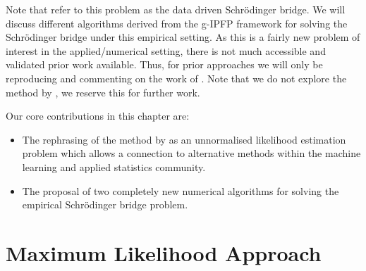 \documentclass[a4paper,12pt,twoside,openright]{report}
\theoremstyle{definition}
\begin{document}
Note that \cite{pavon2018data} refer to this problem as the data driven Schrödinger bridge. We will discuss different algorithms derived from the g-IPFP framework for solving the Schrödinger bridge under this empirical setting. As this is a fairly new problem of interest in the applied/numerical setting, there is not much accessible and validated prior work available. Thus, for prior approaches we will only be reproducing and commenting on the work of \cite{pavon2018data}. Note that we do not explore the method by \cite{bernton2019schr}, we reserve this for further work.

Our core contributions in this chapter are:

\begin{itemize}
    \item The rephrasing of the method by \cite{pavon2018data} as an unnormalised likelihood estimation problem which allows a connection to alternative methods within the machine learning and applied statistics community.
    \item The proposal of two completely new numerical algorithms for solving the empirical Schrödinger bridge problem.
\end{itemize}



\section{Maximum Likelihood Approach \citep{pavon2018data}}
\end{document}
